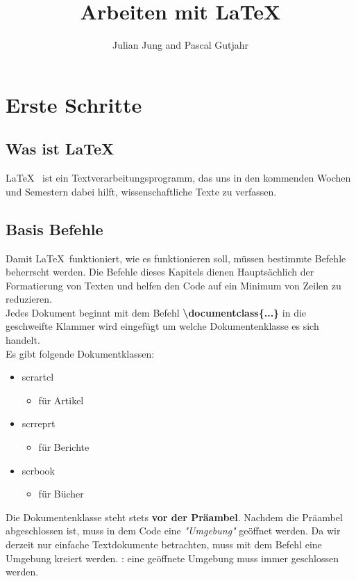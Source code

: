 \documentclass[titlepage=firstiscover]{scrartcl}
\begin{document}
\title{Arbeiten mit \LaTeX}
\author{Julian Jung and Pascal Gutjahr}
\maketitle
\tableofcontents
\newpage
\section{Erste Schritte}
\subsection{Was ist \LaTeX}
\LaTeX ~ ist ein Textverarbeitungsprogramm, das uns in den kommenden
Wochen und Semestern dabei hilft, wissenschaftliche Texte zu verfassen.
\subsection{Basis Befehle}
Damit \LaTeX ~funktioniert, wie es funktionieren soll, müssen bestimmte Befehle
beherrscht werden. Die Befehle dieses Kapitels dienen Hauptsächlich der Formatierung
von Texten und helfen den Code auf ein Minimum von Zeilen zu reduzieren. \\
Jedes Dokument beginnt mit dem Befehl \textbf{\textbackslash documentclass\{...\}}
in die geschweifte Klammer wird eingefügt um welche Dokumentenklasse es sich
handelt. \\
Es gibt folgende Dokumentklassen:
\begin{itemize}
  \item {scrartcl}
  \begin{itemize}
    \item für Artikel
  \end{itemize}
  \item {scrreprt}
  \begin{itemize}
    \item für Berichte
  \end{itemize}
  \item {scrbook}
  \begin{itemize}
    \item für Bücher
  \end{itemize}
\end{itemize}
Die Dokumentenklasse steht stets \textbf{vor der Präambel}. Nachdem die Präambel
abgeschlossen ist, muss in dem Code eine \textit{"Umgebung"} geöffnet werden.
Da wir derzeit nur einfache Textdokumente betrachten, muss mit dem Befehl
eine Umgebung kreiert werden.
: eine geöffnete Umgebung muss immer geschlossen werden.
\end{document}
